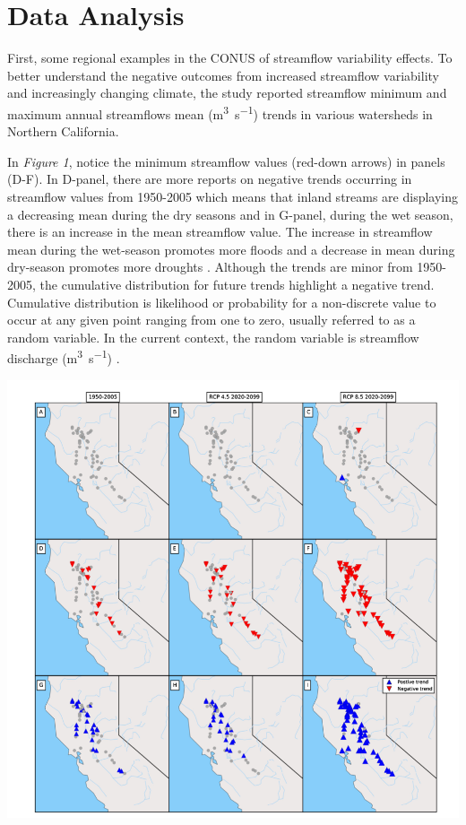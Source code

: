 \documentclass[a4paper,man,biblatex]{apa7}
\begin{document}
\section{Data Analysis}  
\par First, some regional examples in the CONUS of streamflow variability effects. To better understand the negative outcomes from increased streamflow variability and increasingly changing climate, the \textcite{mallakpour_2018} study reported streamflow minimum and maximum annual streamflows mean (\si{\cubic\meter\per\second}) trends in various watersheds in Northern California.\\ 
\par In \textit{Figure 1}, notice the minimum streamflow values (red-down arrows) in panels (D-F). In D-panel, there are more reports on negative trends occurring in streamflow values from 1950-2005 which means that inland streams are displaying a decreasing mean during the dry seasons and in G-panel, during the wet season, there is an increase in the mean streamflow value. The increase in streamflow mean during the wet-season promotes more floods and a decrease in mean during dry-season promotes more droughts \autocite{mallakpour_2018}. Although the trends are minor from 1950-2005, the cumulative distribution for future trends highlight a negative trend. Cumulative distribution is likelihood or probability for a non-discrete value to occur at any given point ranging from one to zero, usually referred to as a random variable. In the current context, the random variable is streamflow discharge (\si{\cubic\meter\per\second}) \autocite{cdf_def}.\\
 \begin{minipage}{0.5\linewidth}   
     \includegraphics[scale=0.4]{stream_flow_cali.png}
     \label{fig:streamflow_trend}
\end{minipage}
\end{document}
